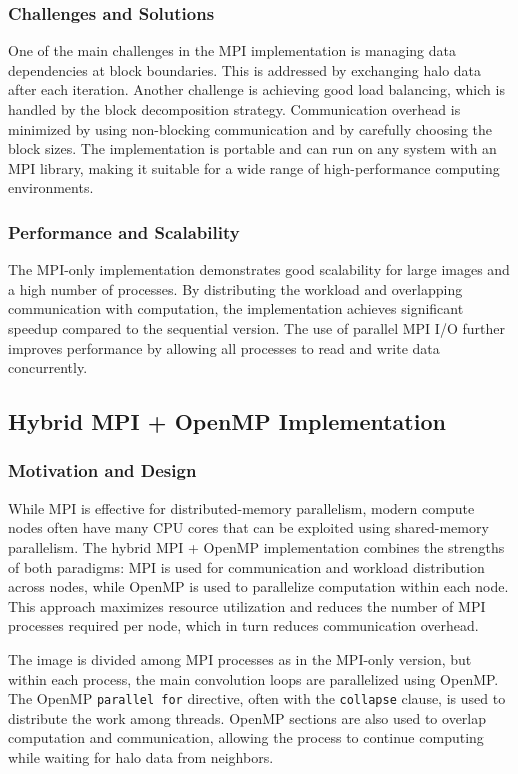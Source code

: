 \documentclass[conference, 10pt]{IEEEtran}
\begin{document}
\subsubsection{Challenges and Solutions}
One of the main challenges in the MPI implementation is managing data dependencies at block boundaries. This is addressed by exchanging halo data after each iteration. Another challenge is achieving good load balancing, which is handled by the block decomposition strategy. Communication overhead is minimized by using non-blocking communication and by carefully choosing the block sizes. The implementation is portable and can run on any system with an MPI library, making it suitable for a wide range of high-performance computing environments.

\subsubsection{Performance and Scalability}
The MPI-only implementation demonstrates good scalability for large images and a high number of processes. By distributing the workload and overlapping communication with computation, the implementation achieves significant speedup compared to the sequential version. The use of parallel MPI I/O further improves performance by allowing all processes to read and write data concurrently.

\subsection{Hybrid MPI + OpenMP Implementation}
\subsubsection{Motivation and Design}
While MPI is effective for distributed-memory parallelism, modern compute nodes often have many CPU cores that can be exploited using shared-memory parallelism. The hybrid MPI + OpenMP implementation combines the strengths of both paradigms: MPI is used for communication and workload distribution across nodes, while OpenMP is used to parallelize computation within each node. This approach maximizes resource utilization and reduces the number of MPI processes required per node, which in turn reduces communication overhead.

The image is divided among MPI processes as in the MPI-only version, but within each process, the main convolution loops are parallelized using OpenMP. The OpenMP \texttt{parallel for} directive, often with the \texttt{collapse} clause, is used to distribute the work among threads. OpenMP sections are also used to overlap computation and communication, allowing the process to continue computing while waiting for halo data from neighbors.
\end{document}
